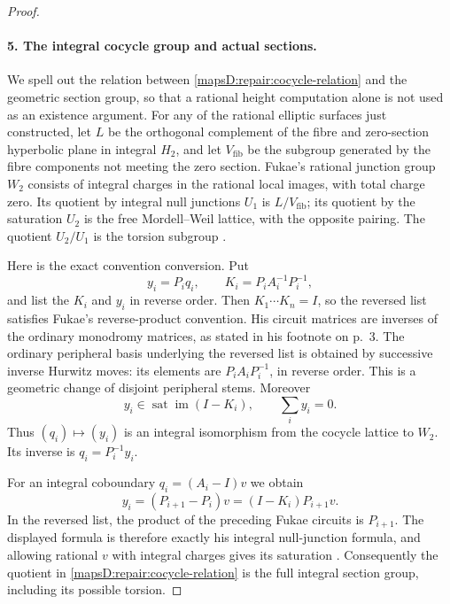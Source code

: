 \begin{proof}
\paragraph{5. The integral cocycle group and actual sections.}
We spell out the relation between
\eqref{mapsD:repair:cocycle-relation} and the geometric section
group, so that a rational height computation alone is not used
as an existence argument.  For any of the rational elliptic
surfaces just constructed, let $L$ be the orthogonal complement
of the fibre and zero-section hyperbolic plane in integral
$H_2$, and let $V_{\mathrm{fib}}$ be the subgroup generated by
the fibre components not meeting the zero section.  Fukae's
rational junction group $W_2$ consists of integral charges in
the rational local images, with total charge zero.  Its quotient
by integral null junctions $U_1$ is $L/V_{\mathrm{fib}}$;
its quotient by the saturation $U_2$ is the free Mordell--Weil
lattice, with the opposite pairing.  The quotient $U_2/U_1$
is the torsion subgroup
\cite[Lemma~4.1, Theorem~4.2 and Corollaries~4.2--4.3,
pp.~21--22]{manFukae02}.

Here is the exact convention conversion.  Put
\[
 y_i=P_iq_i,\qquad K_i=P_iA_i^{-1}P_i^{-1},
\]
and list the $K_i$ and $y_i$ in reverse order.  Then
$K_1\cdots K_n=I$, so the reversed list satisfies Fukae's
reverse-product convention.  His circuit matrices are inverses
of the ordinary monodromy matrices, as stated in his footnote
on p.~3.  The ordinary peripheral basis underlying the reversed
list is obtained by successive inverse Hurwitz moves:
its elements are $P_iA_iP_i^{-1}$, in reverse order.  This is a
geometric change of disjoint peripheral stems.  Moreover
\[
 y_i\in\operatorname{sat}\operatorname{im}(I-K_i),\qquad
 \sum_i y_i=0.
\]
Thus $(q_i)\mapsto(y_i)$ is an integral isomorphism from the
cocycle lattice to $W_2$.  Its inverse is $q_i=P_i^{-1}y_i$.

For an integral coboundary $q_i=(A_i-I)v$ we obtain
\[
 y_i=(P_{i+1}-P_i)v
     =(I-K_i)P_{i+1}v.
\]
In the reversed list, the product of the preceding Fukae
circuits is $P_{i+1}$.  The displayed formula is therefore
exactly his integral null-junction formula, and allowing
rational $v$ with integral charges gives its saturation
\cite[Lemmas~3.1--3.2, (11), pp.~11--13]{manFukae02}.
Consequently the quotient in
\eqref{mapsD:repair:cocycle-relation} is the full integral
section group, including its possible torsion.


\end{proof}
